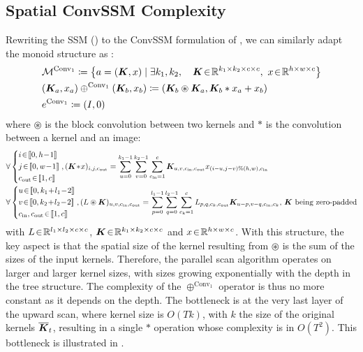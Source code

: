 \documentclass{article}
\begin{document}
\subsection{Spatial ConvSSM Complexity}
\label{app:Spatial_ConvSSM_complexity}
Rewriting the SSM () to the ConvSSM formulation of , we can similarly adapt the monoid structure as :
\begin{align}
    &\mathcal{M}^{\mathrm{Conv}_1}\coloneqq \left\{a = (\bm{K}, x)\mid \exists k_1, k_2,\quad \bm{K}\!\in\!\mathbb{R}^{k_1\times k_2\times c\times c},~x\!\in\!\mathbb{R}^{h \times w \times c}\right\}\\
    &(\bm{K}_a, x_a) \oplus^{\mathrm{Conv}_1} (\bm{K}_b,x_b)\coloneqq (\bm{K}_b \circledast \bm{K}_a, \bm{K}_b \ast x_a + x_b)\\
    &e^{\mathrm{Conv}_1}\coloneqq(I, 0)
\end{align}
\noindent where $\circledast$ is the block convolution between two kernels and $\ast$ is the convolution between a kernel and an image:
\begin{align*}
    & \forall \left\{
\begin{aligned}
    &i\!\in\!\intint{0}{h\!-\!1}\\
    &j\!\in\!\intint{0}{w\!-\!1}\\
    &c_{\mathrm{out}}\!\in\!\intint{1}{c}
\end{aligned}
\right., (\Kmat\!\ast\!x)_{i,j,c_{\mathrm{out}}} = \sum_{u=0}^{k_1-1}\sum_{v=0}^{k_2-1}\sum_{c_{\mathrm{in}}=1}^{c} \Kmat_{u,v,c_{\mathrm{in}},c_{\mathrm{out}}} x_{(i-u,j-v)\%(h,w),c_{\mathrm{in}}}\\
    & \forall \left\{
\begin{aligned}
    &u\!\in\!\intint{0}{k_1\!+\!l_1\!-\!2}\\
    &v\!\in\!\intint{0}{k_2\!+\!l_2\!-\!2}\\
    &c_{\mathrm{in}},c_{\mathrm{out}}\!\in\!\intint{1}{c}
\end{aligned}
\right., (L \circledast \Kmat)_{u,v,c_{\mathrm{in}},c_{\mathrm{out}}} = \sum_{p=0}^{l_1-1}\sum_{q=0}^{l_2-1}\sum_{c_{k}=1}^{c} L_{p,q,c_{k},c_{\mathrm{out}}} \Kmat_{u-p,v-q,c_{\mathrm{in}},c_{k}}\text{, $\Kmat$ being zero-padded}
\end{align*}
\noindent with $L\!\in\!\mathbb{R}^{l_1\times l_2\times c \times c}$, $\bm{K}\!\in\!\mathbb{R}^{k_1\times k_2\times c \times c}$ and $x\!\in\!\mathbb{R}^{h \times w \times c}$.
With this structure, the key aspect is that the spatial size of the kernel resulting from $\circledast$ is the sum of the sizes of the input kernels. Therefore, the parallel scan algorithm operates on larger and larger kernel sizes, with sizes growing exponentially with the depth in the tree structure. The complexity of the $\oplus^{\mathrm{Conv}_1}$ operator is thus no more constant as it depends on the depth. The bottleneck is at the very last layer of the upward scan, where kernel size is $O(Tk)$, with $k$ the size of the original kernels $\overline{\bm{K}}_t$, resulting in a single $\ast$ operation whose complexity is in $O(T^2)$. This bottleneck is illustrated in .
\end{document}
